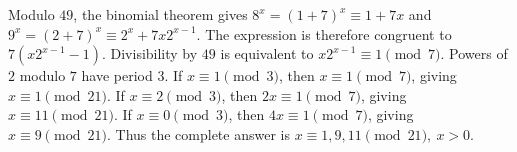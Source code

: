 Modulo $49$, the binomial theorem gives $8^x=(1+7)^x\equiv 1+7x$ and $9^x=(2+7)^x\equiv 2^x+7x2^{x-1}$. The expression is therefore congruent to $7(x2^{x-1}-1)$. Divisibility by $49$ is equivalent to $x2^{x-1}\equiv 1\pmod 7$. Powers of $2$ modulo $7$ have period $3$. If $x\equiv 1\pmod 3$, then $x\equiv 1\pmod 7$, giving $x\equiv 1\pmod{21}$. If $x\equiv 2\pmod 3$, then $2x\equiv 1\pmod 7$, giving $x\equiv 11\pmod{21}$. If $x\equiv 0\pmod 3$, then $4x\equiv 1\pmod 7$, giving $x\equiv 9\pmod{21}$. Thus the complete answer is $\boxed{x\equiv 1,9,11\pmod{21},\ x>0}$.

